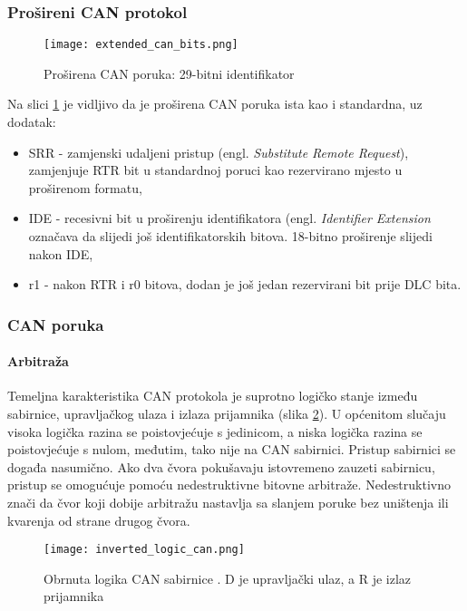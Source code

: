 \subsubsection{Prošireni CAN protokol}

\begin{figure}[H]
	\centering
	\texttt{[image: extended\_can\_bits.png]}
	\caption{Proširena CAN poruka: 29-bitni identifikator \cite[str. 4]{can_manual}}
	\label{fig:extended_can_bits}
\end{figure}
Na slici \ref{fig:extended_can_bits} je vidljivo da je proširena CAN poruka ista kao i standardna, uz dodatak:
\begin{itemize}
	\item SRR - zamjenski udaljeni pristup (engl. \textit{Substitute Remote Request}), zamjenjuje RTR bit u standardnoj poruci kao rezervirano mjesto u proširenom formatu,
	\item IDE - recesivni bit u proširenju identifikatora (engl. \textit{Identifier Extension} označava da slijedi još identifikatorskih bitova. 18-bitno proširenje slijedi nakon IDE,
	\item r1 - nakon RTR i r0 bitova, dodan je još jedan rezervirani bit prije DLC bita.
\end{itemize}

\subsubsection{CAN poruka}

\paragraph{Arbitraža}

Temeljna karakteristika CAN protokola je suprotno logičko stanje između sabirnice, upravljačkog ulaza i izlaza prijamnika (slika \ref{fig:inverted_logic_can}). U općenitom slučaju visoka logička razina se poistovjećuje s jedinicom, a niska logička razina se poistovjećuje s nulom, međutim, tako nije na CAN sabirnici. Pristup sabirnici se događa nasumično. Ako dva čvora pokušavaju istovremeno zauzeti sabirnicu, pristup se omogućuje pomoću nedestruktivne bitovne arbitraže. Nedestruktivno znači da čvor koji dobije arbitražu nastavlja sa slanjem poruke bez uništenja ili kvarenja od strane drugog čvora.
\begin{figure}[H]
	\centering
	\texttt{[image: inverted\_logic\_can.png]}
	\caption{Obrnuta logika CAN sabirnice \cite[str. 4]{can_manual}. D je upravljački ulaz, a R je izlaz prijamnika}
	\label{fig:inverted_logic_can}
\end{figure}


